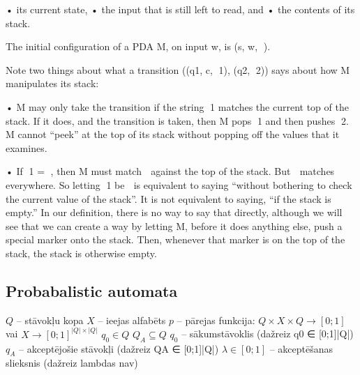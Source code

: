 \documentclass{article}
\begin{document}
• its current state, • the input that is still left to read, and • the contents
of its stack. 
 
The initial configuration of a PDA M, on input w, is (s, w, ).

Note two things about what a transition ((q1, c, 1), (q2, 2)) says about how
M manipulates its stack: 
 
• M may only take the transition if the string 1 matches the current top of
the stack.  If it does, and the transition is taken, then M pops 1 and then
pushes 2.  M cannot “peek” at the top of its stack without popping off the
values that it examines. 
 
• If 1 = , then M must match  against the top of the stack.  But  matches
everywhere.  So letting 1 be  is equivalent to saying “without bothering to
check the current value of the stack”.  It is not equivalent to saying, “if the
stack is empty.”  In our definition, there is no way to say that directly,
although we will see that we can create a way by letting M, before it does
anything else, push a special marker onto the stack.  Then, whenever that
marker is on the top of the stack, the stack is otherwise empty. 


\subsection{Probabalistic automata}

$Q$ – stāvokļu kopa
$X$ – ieejas alfabēts
$p$ – pārejas funkcija: $Q \times X \times Q → [0;1]$ vai $X \to {[0;1]}^{|Q|\times|Q|}$
$q_0 \in Q$ 
$Q_A \subseteq Q$ 
$q_0$ – sākumstāvoklis (dažreiz q0 ∈ [0;1]|Q|)
$q_A$ – akceptējošie stāvokļi (dažreiz QA ∈ [0;1]|Q|)
$\lambda \in [0;1]$ – akceptēšanas slieksnis (dažreiz lambdas nav)
\end{document}
